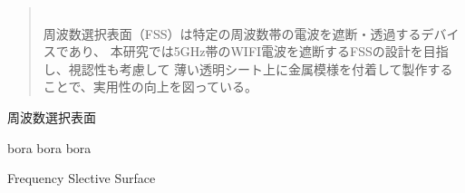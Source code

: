 \documentclass[paper]{ieicej}
\begin{document}
\begin{abstract}
\\
周波数選択表面（FSS）は特定の周波数帯の電波を遮断・透過するデバイスであり、
本研究では5GHz帯のWIFI電波を遮断するFSSの設計を目指し、視認性も考慮して
薄い透明シート上に金属模様を付着して製作することで、実用性の向上を図っている。
\end{abstract}
\begin{keyword}
周波数選択表面
\end{keyword}
\begin{eabstract}
bora bora bora
\end{eabstract}
\begin{ekeyword}
Frequency Slective Surface
\end{ekeyword}
\maketitle
\end{document}
